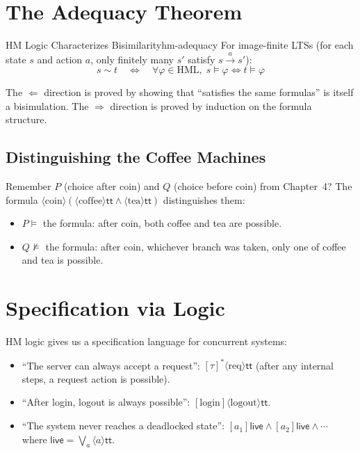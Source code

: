 \documentclass[11pt, a4paper, oneside]{book}
\newcommand{\bisim}{\sim}
\begin{document}
\section{The Adequacy Theorem}

\begin{thm}{HM Logic Characterizes Bisimilarity}{hm-adequacy}
For image-finite LTSs (for each state $s$ and action $a$, only finitely many
$s'$ satisfy $s \xrightarrow{a} s'$):
\[
  s \bisim t \quad\iff\quad
  \forall \varphi \in \text{HML},\;
  s \models \varphi \iff t \models \varphi
\]
\end{thm}

The $\Leftarrow$ direction is proved by showing that ``satisfies the same
formulas'' is itself a bisimulation. The $\Rightarrow$ direction is proved by
induction on the formula structure.

\subsection{Distinguishing the Coffee Machines}

Remember $P$ (choice after coin) and $Q$ (choice before coin) from Chapter~4?
The formula $\langle\text{coin}\rangle(\langle\text{coffee}\rangle\mathsf{tt}
\wedge \langle\text{tea}\rangle\mathsf{tt})$ distinguishes them:
\begin{itemize}[nosep]
\item $P \models$ the formula: after coin, both coffee and tea are possible.
\item $Q \not\models$ the formula: after coin, whichever branch was taken,
  only one of coffee and tea is possible.
\end{itemize}

\section{Specification via Logic}

HM logic gives us a specification language for concurrent systems:

\begin{itemize}[nosep]
\item ``The server can always accept a request'':
  $[\tau]^*\langle\text{req}\rangle\mathsf{tt}$
  (after any internal steps, a request action is possible).
\item ``After login, logout is always possible'':
  $[\text{login}]\langle\text{logout}\rangle\mathsf{tt}$.
\item ``The system never reaches a deadlocked state'':
  $[a_1]\mathsf{live} \wedge [a_2]\mathsf{live} \wedge \cdots$
  where $\mathsf{live} = \bigvee_a \langle a \rangle \mathsf{tt}$.
\end{itemize}
\end{document}

